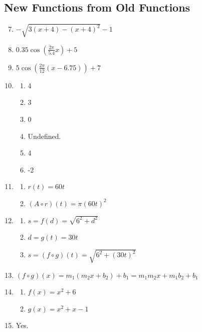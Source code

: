 \documentclass{article}
\begin{document}
\subsection{New Functions from Old Functions}
\begin{enumerate}
  \setcounter{enumi}{6}
  \item $-\sqrt{3(x+4)-(x+4)^2}-1$
        \setcounter{enumi}{25}
  \item $0.35\cos\left(\frac{2\pi}{5.4}x\right)+5$
  \item $5\cos\left(\frac{2\pi}{12}(x-6.75)\right)+7$
        \setcounter{enumi}{52}
  \item \begin{enumerate}[label=(\alph*)]
          \item 4
          \item 3
          \item 0
          \item Undefined.
          \item 4
          \item -2
        \end{enumerate}
        \setcounter{enumi}{54}
  \item \begin{enumerate}[label=(\alph*)]
          \item $r(t) = 60t$
          \item $(A \circ r)(t) = \pi(60t)^2$
        \end{enumerate}
        \setcounter{enumi}{56}
  \item \begin{enumerate}[label=(\alph*)]
          \item $s = f(d) = \sqrt{6^2+d^2}$
          \item $d = g(t) = 30t$
          \item $s = (f \circ g)(t) = \sqrt{6^2+(30t)^2}$
        \end{enumerate}
        \setcounter{enumi}{60}
  \item $(f \circ g)(x) = m_1(m_2x+b_2)+b_1 = m_1m_2x+m_1b_2+b_1$
        \setcounter{enumi}{62}
  \item \begin{enumerate}[label=(\alph*)]
          \item $f(x) = x^2 + 6$
          \item $g(x) = x^2 + x - 1$
        \end{enumerate}
        \setcounter{enumi}{63}
  \item Yes.
\end{enumerate}
\end{document}
